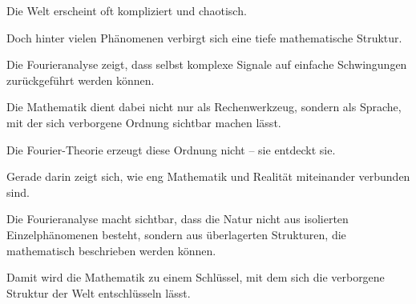\begin{NoteBox}
	\small
	\label{box:fourier-mathematische-ordnung}
	Die Welt erscheint oft kompliziert und chaotisch.
	
	Doch hinter vielen Phänomenen verbirgt sich
	eine tiefe mathematische Struktur.
	
	Die Fourieranalyse zeigt,
	dass selbst komplexe Signale
	auf einfache Schwingungen zurückgeführt werden können.
\end{NoteBox}

Die Mathematik dient dabei nicht nur als Rechenwerkzeug,
sondern als Sprache,
mit der sich verborgene Ordnung sichtbar machen lässt.

Die Fourier-Theorie erzeugt diese Ordnung nicht --
sie entdeckt sie.

Gerade darin zeigt sich,
wie eng Mathematik und Realität miteinander verbunden sind.

Die Fourieranalyse macht sichtbar,
dass die Natur nicht aus isolierten Einzelphänomenen besteht,
sondern aus überlagerten Strukturen,
die mathematisch beschrieben werden können.

Damit wird die Mathematik zu einem Schlüssel,
mit dem sich die verborgene Struktur der Welt entschlüsseln lässt.
